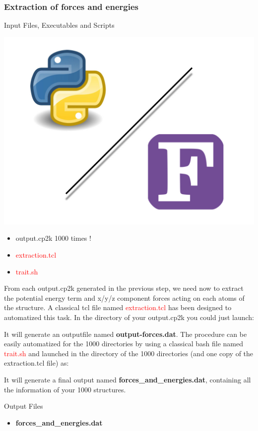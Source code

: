 \documentclass[12pt]{article}
\begin{document}
\subsubsection{Extraction of forces and energies}
\begin{mybox2}{{Input Files, Executables and Scripts}}
\begin{minipage}[c]{0.5\linewidth}
\includegraphics[scale=0.1]{Python-fortran.jpeg}
\end{minipage}
\begin{minipage}[c]{0.5\linewidth}
\begin{itemize}
    \item output.cp2k 1000 times !
    \item \textcolor{red}{extraction.tcl}
    \item \textcolor{red}{trait.sh}
\end{itemize}
\end{minipage}
\end{mybox2}
From each output.cp2k generated in the previous step, we need now to extract the potential energy term and x/y/z component forces acting on each atoms of the structure. A classical tcl file named \textcolor{red}{extraction.tcl} has been designed to automatized this task. In the directory of your output.cp2k you could just launch:
\begin{center}
\end{center}
It will generate an outputfile named \textbf{output-forces.dat}. The procedure can be easily automatized for the 1000 directories by using a classical bash file named \textcolor{red}{trait.sh} and launched in the directory of the 1000 directories (and one copy of the extraction.tcl file)  as:
\begin{center}
\end{center}
It will generate a final output named \textbf{forces\_and\_energies.dat}, containing all the information of your 1000 structures. 
\\
\begin{mybox3}{Output Files}
\begin{itemize}
    \item \textbf{forces\_and\_energies.dat}
\end{itemize}
\end{mybox3}
%
\end{document}

